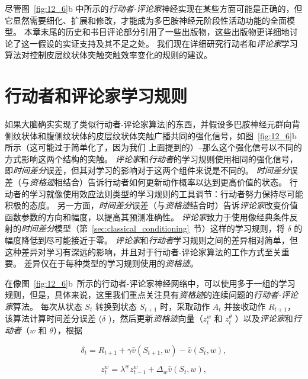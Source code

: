 尽管图~\ref{fig:12_6}b 中所示的\textit{行动者-评论家}神经实现在某些方面可能是正确的，但它显然需要细化、扩展和修改，才能成为多巴胺神经元阶段性活动功能的全面模型。
本章末尾的历史和书目评论部分引用了一些出版物，这些出版物更详细地讨论了这一假设的实证支持及其不足之处。
我们现在详细研究行动者和\textit{评论家}学习算法对控制皮层纹状体突触突触效率变化的规则的建议。





\section{行动者和评论家学习规则} \label{sec:ac_rules}

如果大脑确实实现了类似行动者-评论家算法|的东西，并假设多巴胺神经元群向背侧纹状体和腹侧纹状体的皮层纹状体突触广播共同的强化信号，如图~\ref{fig:12_6}b 所示（这可能过于简单化了，因为我们 上面提到的）--那么这个强化信号以不同的方式影响这两个结构的突触。
\textit{评论家}和\textit{行动者}的学习规则使用相同的强化信号，即\textit{时间差分}误差，但其对学习的影响对于这两个组件来说是不同的。
\textit{时间差分}误差（与\textit{资格迹}相结合）告诉行动者如何更新动作概率以达到更高价值的状态。
行动者的学习就像使用效应法则类型的学习规则的工具调节：行动者努力保持尽可能积极的态度。
另一方面，\textit{时间差分}误差（与\textit{资格迹}结合时）告诉\textit{评论家}改变价值函数参数的方向和幅度，以提高其预测准确性。
\textit{评论家}致力于使用像经典条件反射的\textit{时间差分}模型（第~\ref{sec:classical_conditioning}~节）这样的学习规则，将 $\delta$ 的幅度降低到尽可能接近于零。
\textit{评论家}和\textit{行动者}学习规则之间的差异相对简单，但这种差异对学习有深远的影响，并且对于行动者-评论家算法的工作方式至关重要。
差异仅在于每种类型的学习规则使用的\textit{资格迹}。


在像图~\ref{fig:12_6}b~所示的行动者-评论家神经网络中，可以使用多于一组的学习规则，但是，具体来说，这里我们重点关注具有\textit{资格迹}的连续问题的\textit{行动者-评论家}算法。
每次从状态 $S_t$ 转换到状态 $S_{t+1}$ 时，采取动作 $A_t$ 并接收动作 $R_{t+1}$，该算法计算时间差分误差 ($\delta$ )，然后更新\textit{资格迹}向量（$z_t^w$ 和 $z_t^{\theta}$ ）以及\textit{评论家}和\textit{行动者}（$w$ 和 $\theta$），根据

\begin{equation}
	\delta_t = R_{t+1}
		+ \gamma \hat{v} (S_{t+1}, w)
		- \hat{v} (S_t, w),
\end{equation}


\begin{equation}
	z_t ^w = \lambda^w z_{t-1}^w
		+ \Delta_w \hat{v} (S_t, w),
\end{equation}

